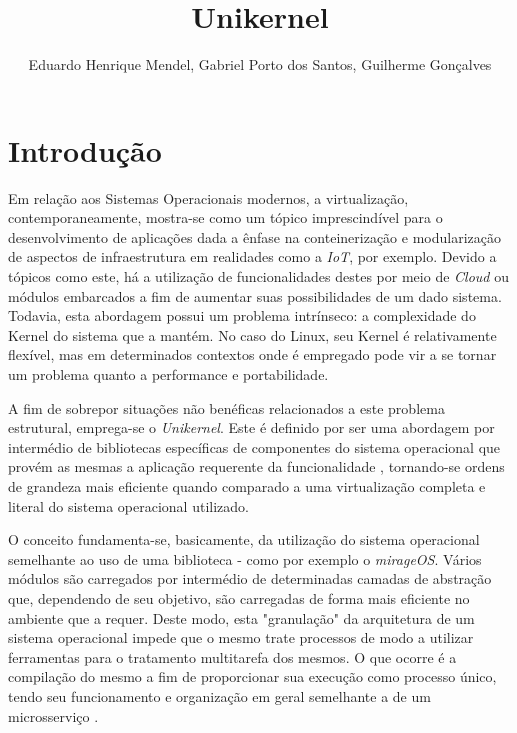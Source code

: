 \documentclass[12pt]{article}
\title{Unikernel}
\author{Eduardo Henrique Mendel\inst{1}, Gabriel Porto dos Santos\inst{1}, Guilherme Gonçalves\inst{1}}
\begin{document}
 

\maketitle


     



\section{Introdução}

Em relação aos Sistemas Operacionais modernos, a virtualização, contemporaneamente, mostra-se como um tópico imprescindível para o desenvolvimento de aplicações dada a ênfase na conteinerização e modularização de aspectos de infraestrutura em realidades como a \textit{IoT}, por exemplo. Devido a tópicos como este, há a utilização de funcionalidades destes por meio de \textit{Cloud} ou módulos embarcados a fim de aumentar suas possibilidades de um dado sistema. Todavia, esta abordagem possui um problema intrínseco: a complexidade do Kernel do sistema que a mantém. No caso do Linux, seu Kernel é relativamente flexível, mas em determinados contextos onde é empregado pode vir a se tornar um problema quanto a performance e portabilidade.

A fim de sobrepor situações não benéficas relacionados a este problema estrutural, emprega-se o \textit{Unikernel}. Este é definido por ser uma abordagem por intermédio de bibliotecas específicas de componentes do sistema operacional que provém as mesmas a aplicação requerente da funcionalidade \cite{raza:196}, tornando-se ordens de grandeza mais eficiente quando comparado a uma virtualização completa e literal do sistema operacional utilizado.

O conceito fundamenta-se, basicamente, da utilização do sistema operacional semelhante ao uso de uma biblioteca - como por exemplo o \textit{mirageOS}. Vários módulos são carregados por intermédio de determinadas camadas de abstração que, dependendo de seu objetivo, são carregadas de forma mais eficiente no ambiente que a requer. Deste modo, esta "granulação" da arquitetura de um sistema operacional impede que o mesmo trate processos de modo a utilizar ferramentas para o tratamento multitarefa dos mesmos. O que ocorre é a compilação do mesmo a fim de proporcionar sua execução como processo único, tendo seu funcionamento e organização em geral semelhante a de um microsserviço \cite{fraga:120}.
\end{document}
